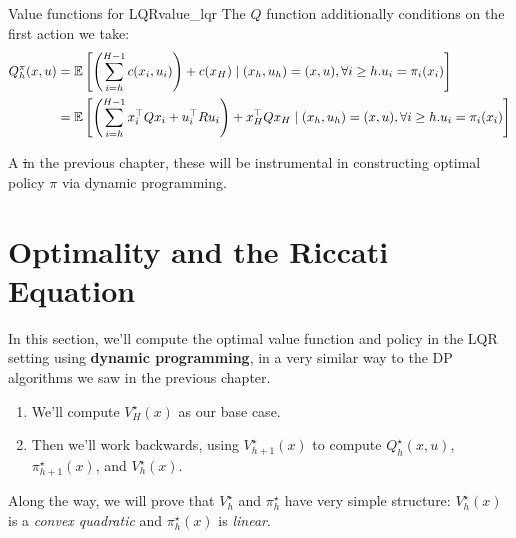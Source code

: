 \documentclass[../main/main]{subfiles}
\begin{document}
\begin{definition}{Value functions for LQR}{value_lqr}
    The $Q$ function additionally conditions on the first
    action we take:
    \[
        \begin{split}
            Q^\pi_h (x, u) &= \operatorname*{\mathbb{E}} \left[ \left( \sum_{i=h}^{H-1} c(x_i, u_i) \right) + c(x_H) \mid  (x_h, u_h) = (x, u), \forall i \ge h. u_i = \pi_i(x_i) \right] \\
            &= \operatorname*{\mathbb{E}} \left[ \left( \sum_{i=h}^{H-1} x_i^\top Q x_i + u_i^\top R u_i \right) + x_H^\top Q x_H \mid (x_h, u_h) = (x, u), \forall i \ge h. u_i = \pi_i(x_i) \right] \\
        \end{split}
    \]
\end{definition}

A \st in the previous chapter, these will be instrumental in constructing optimal policy $\pi$ via dynamic
programming.

\section{Optimality and the Riccati Equation} \label{sec:optimal_lqr}

In this section, we'll compute the optimal value function and policy in the LQR setting using \textbf{dynamic programming}, in a very similar way to the DP algorithms we saw in the previous chapter. %
\begin{enumerate}
    \item We'll compute $V_H^\star(x)$ as our base case.
    \item Then we'll work backwards, using $V_{h+1}^\star(x)$ to compute $Q_h^\star(x, u)$, $\pi_{h+1}^\star(x)$, and $V_h^\star(x)$.
\end{enumerate}
Along the way, we will prove that $V_h^\star$ and $\pi_h^\star$ have very simple structure: $V_h^\star(x)$ is a \emph{convex quadratic} and $\pi_h^\star(x)$ is \emph{linear}.
\end{document}
